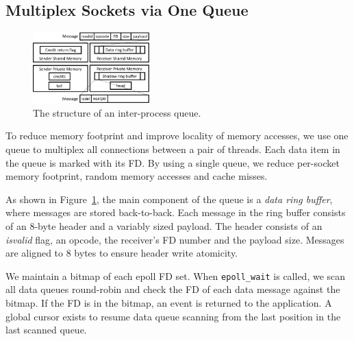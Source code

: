 
\iffalse
\subsection{Multiplex Sockets via One Queue}
\label{subsec:multiplex-conn}

\begin{figure}[t]
	\centering
	\includegraphics[width=0.4\textwidth]{images/locklessq_new}
	\vspace{-5pt}
	\caption{The structure of an inter-process queue.}
	\vspace{-15pt}
	\label{fig:locklessq-structure}
\end{figure}


To reduce memory footprint and improve locality of memory accesses, we use one queue to multiplex all connections between a pair of threads. Each data item in the queue is marked with its FD. By using a single queue, we reduce per-socket memory footprint, random memory accesses and cache misses.

As shown in Figure~\ref{fig:locklessq-structure}, the main component of the queue is a \emph{data ring buffer}, where messages are stored back-to-back.
Each message in the ring buffer consists of an 8-byte header and a variably sized payload. The header consists of an \textit{isvalid} flag, an opcode, the receiver's FD number and the payload size. Messages are aligned to 8 bytes to ensure header write atomicity.%

We maintain a bitmap of each epoll FD set.
When \texttt{epoll\_wait} is called, we scan all data queues round-robin and check the FD of each data message against the bitmap. If the FD is in the bitmap, an event is returned to the application.
A global cursor exists to resume data queue scanning from the last position in the last scanned queue.

